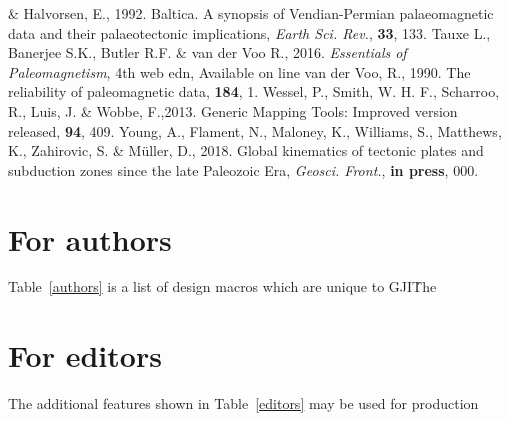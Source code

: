 \begin{thebibliography}{}
  \& Halvorsen, E., 1992. Baltica. A synopsis of Vendian-Permian palaeomagnetic
  data and their palaeotectonic implications, \textit{Earth Sci. Rev.},
  \textbf{33}, 133.
  Tauxe L., Banerjee S.K., Butler R.F. \& van der Voo R., 2016.
  \textit{Essentials of Paleomagnetism}, 4th web edn, Available on line
  van der Voo, R., 1990. The reliability of paleomagnetic data,
  \tecto{}\textbf{184}, 1.
  Wessel, P., Smith, W. H. F., Scharroo, R., Luis, J. \& Wobbe, F.,2013. Generic
  Mapping Tools: Improved version released, \eos{}\textbf{94}, 409.
  Young, A., Flament, N., Maloney, K., Williams, S., Matthews, K., Zahirovic,
  S.
  \& Müller, D., 2018. Global kinematics of tectonic plates and subduction zones
  since the late Paleozoic Era, \textit{Geosci. Front.},
  \textbf{in press}, 000.
\end{thebibliography}


\appendix
\section{For authors}

Table~\ref{authors} is a list of design macros which are unique to GJI\. The

\section{For editors}

The additional features shown in Table~\ref{editors} may be used for production

\bsp{} %
~\label{lastpage}
